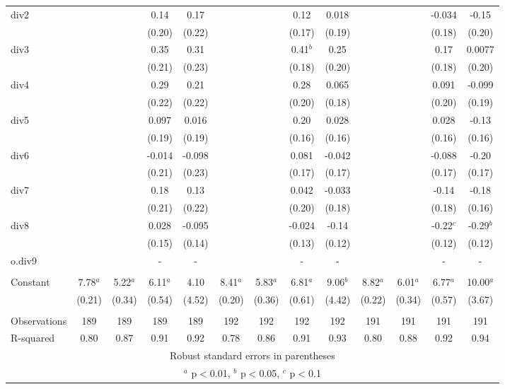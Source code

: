 \documentclass[]{article}
\begin{document}
\begin{tabular}{lcccccccccccc}
div2 &  &  & 0.14 & 0.17 &  &  & 0.12 & 0.018 &  &  & -0.034 & -0.15 \\
 &  &  & (0.20) & (0.22) &  &  & (0.17) & (0.19) &  &  & (0.18) & (0.20) \\
div3 &  &  & 0.35 & 0.31 &  &  & 0.41$^b$ & 0.25 &  &  & 0.17 & 0.0077 \\
 &  &  & (0.21) & (0.23) &  &  & (0.18) & (0.20) &  &  & (0.18) & (0.20) \\
div4 &  &  & 0.29 & 0.21 &  &  & 0.28 & 0.065 &  &  & 0.091 & -0.099 \\
 &  &  & (0.22) & (0.22) &  &  & (0.20) & (0.18) &  &  & (0.20) & (0.19) \\
div5 &  &  & 0.097 & 0.016 &  &  & 0.20 & 0.028 &  &  & 0.028 & -0.13 \\
 &  &  & (0.19) & (0.19) &  &  & (0.16) & (0.16) &  &  & (0.16) & (0.16) \\
div6 &  &  & -0.014 & -0.098 &  &  & 0.081 & -0.042 &  &  & -0.088 & -0.20 \\
 &  &  & (0.21) & (0.23) &  &  & (0.17) & (0.17) &  &  & (0.17) & (0.17) \\
div7 &  &  & 0.18 & 0.13 &  &  & 0.042 & -0.033 &  &  & -0.14 & -0.18 \\
 &  &  & (0.21) & (0.22) &  &  & (0.20) & (0.18) &  &  & (0.18) & (0.16) \\
div8 &  &  & 0.028 & -0.095 &  &  & -0.024 & -0.14 &  &  & -0.22$^c$ & -0.29$^b$ \\
 &  &  & (0.15) & (0.14) &  &  & (0.13) & (0.12) &  &  & (0.12) & (0.12) \\
o.div9 &  &  & - & - &  &  & - & - &  &  & - & - \\
 &  &  &  &  &  &  &  &  &  &  &  &  \\
Constant & 7.78$^a$ & 5.22$^a$ & 6.11$^a$ & 4.10 & 8.41$^a$ & 5.83$^a$ & 6.81$^a$ & 9.06$^b$ & 8.82$^a$ & 6.01$^a$ & 6.77$^a$ & 10.00$^a$ \\
 & (0.21) & (0.34) & (0.54) & (4.52) & (0.20) & (0.36) & (0.61) & (4.42) & (0.22) & (0.34) & (0.57) & (3.67) \\
 &  &  &  &  &  &  &  &  &  &  &  &  \\
Observations & 189 & 189 & 189 & 189 & 192 & 192 & 192 & 192 & 191 & 191 & 191 & 191 \\
 R-squared & 0.80 & 0.87 & 0.91 & 0.92 & 0.78 & 0.86 & 0.91 & 0.93 & 0.80 & 0.88 & 0.92 & 0.94 \\ \hline
\multicolumn{13}{c}{ Robust standard errors in parentheses} \\
\multicolumn{13}{c}{ $^a$ p$<$0.01, $^b$ p$<$0.05, $^c$ p$<$0.1} \\
\end{tabular}
\end{document}
